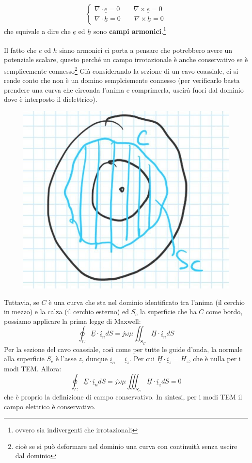 \documentclass{book}
\begin{document}
    \begin{equation}
        \label{eqn:campi_irrotazionali_indivergenti_TEM}
        \begin{cases}
            \nabla \cdot \underline{e} = 0 \qquad \nabla \times \underline{e} = 0
            \\ \nabla \cdot \underline{h} = 0 \qquad \nabla \times \underline{h} = 0
        \end{cases}
    \end{equation}
    che equivale a dire che $\underline{e}$ ed $\underline{h}$ sono \textbf{campi armonici}.\footnote{ovvero sia indivergenti che irrotazionali}
    \\ \\
    Il fatto che $\underline{e}$ ed $\underline{h}$ siano armonici ci porta a pensare che potrebbero avere un potenziale scalare, questo 
    perché un campo irrotazionale è anche conservativo se è semplicemente connesso\footnote{cioè se si può deformare nel dominio una curva con continuità senza uscire dal dominio}
    Già considerando la sezione di un cavo coassiale, ci si rende conto che non è un domino semplciemente connesso (per verificarlo basta prendere una curva che circonda l'anima 
    e comprimerla, uscirà fuori dal dominio dove è interposto il dielettrico).
    \newpage
    \begin{figure}[h!]
        \center 
        \includegraphics[width=0.5\linewidth]{Chapter_two/Chapt2img6.png}
    \end{figure} 
    Tuttavia, se $C$ è una curva che sta nel dominio identificato tra l'anima (il cerchio in mezzo) e la calza
    (il cerchio esterno) ed $S_{c}$ la superficie che ha $C$ come bordo, possiamo applicare la prima legge di Maxwell:
    \begin{equation}
        \oint_{C} \underline{E} \cdot \underline{i}_{n}dS = j \omega \mu \iint_{S_{C}}\underline{H}\cdot \underline{i}_{n}dS
    \end{equation}
    Per la sezione del cavo coassiale, così come per tutte le guide d'onda, la normale alla superficie $S_{c}$ è l'asse $z$, dunque $\underline{i}_{n}=\underline{i}_{z}$.
    Per cui $\underline{H} \cdot \underline{i}_{z}=H_{z}$, che è nulla per i modi TEM. Allora:
    \begin{equation}
        \oint_{C} \underline{E} \cdot \underline{i}_{n}dS = j \omega \mu \iiint_{S_{C}} \underline{H} \cdot \underline{i}_{z} dS = 0
    \end{equation}
    che è proprio la definizione di campo conservativo. In sintesi, per i modi TEM il campo elettrico è conservativo.
\end{document}
